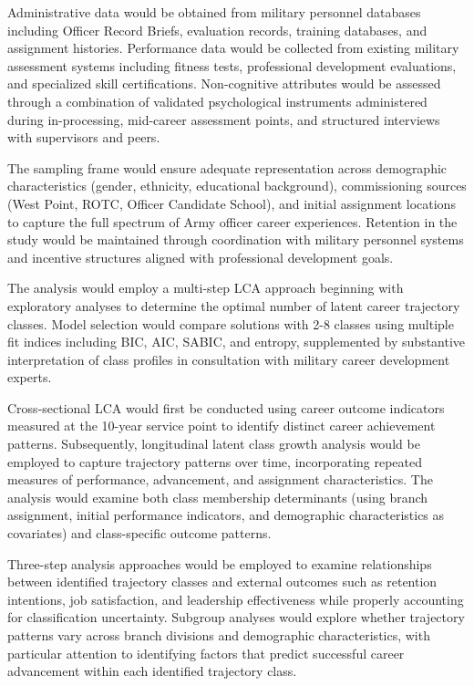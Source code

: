 \documentclass[main.tex]{subfiles}
\begin{document}
Administrative data would be obtained from military personnel databases including Officer Record Briefs, evaluation records, training databases, and assignment histories. Performance data would be collected from existing military assessment systems including fitness tests, professional development evaluations, and specialized skill certifications. Non-cognitive attributes would be assessed through a combination of validated psychological instruments administered during in-processing, mid-career assessment points, and structured interviews with supervisors and peers.

The sampling frame would ensure adequate representation across demographic characteristics (gender, ethnicity, educational background), commissioning sources (West Point, ROTC, Officer Candidate School), and initial assignment locations to capture the full spectrum of Army officer career experiences. Retention in the study would be maintained through coordination with military personnel systems and incentive structures aligned with professional development goals.


The analysis would employ a multi-step LCA approach beginning with exploratory analyses to determine the optimal number of latent career trajectory classes. Model selection would compare solutions with 2-8 classes using multiple fit indices including BIC, AIC, SABIC, and entropy, supplemented by substantive interpretation of class profiles in consultation with military career development experts.

Cross-sectional LCA would first be conducted using career outcome indicators measured at the 10-year service point to identify distinct career achievement patterns. Subsequently, longitudinal latent class growth analysis would be employed to capture trajectory patterns over time, incorporating repeated measures of performance, advancement, and assignment characteristics. The analysis would examine both class membership determinants (using branch assignment, initial performance indicators, and demographic characteristics as covariates) and class-specific outcome patterns.

Three-step analysis approaches would be employed to examine relationships between identified trajectory classes and external outcomes such as retention intentions, job satisfaction, and leadership effectiveness while properly accounting for classification uncertainty. Subgroup analyses would explore whether trajectory patterns vary across branch divisions and demographic characteristics, with particular attention to identifying factors that predict successful career advancement within each identified trajectory class.
\end{document}
